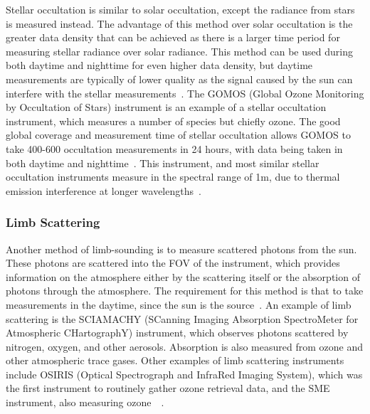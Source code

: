 Stellar occultation is similar to solar occultation, except the radiance from stars is measured instead. The advantage of this method over solar occultation is the greater data density that can be achieved as there is a larger time period for measuring stellar radiance over solar radiance. This method can be used during both daytime and nighttime for even higher data density, but daytime measurements are typically of lower quality as the signal caused by the sun can interfere with the stellar measurements~\citep{SPARC}. The GOMOS (Global Ozone Monitoring by Occultation of Stars) instrument is an example of a stellar occultation instrument, which measures a number of species but chiefly ozone. The good global coverage and measurement time of stellar occultation allows GOMOS to take 400-600 occultation measurements in 24 hours, with data being taken in both daytime and nighttime~\citep{GOMOS_stellar_occulation}. This instrument, and most similar stellar occultation instruments measure in the spectral range of 1\textmu m, due to thermal emission interference at longer wavelengths~\citep{SPARC}.

\subsubsection{Limb Scattering}
Another method of limb-sounding is to measure scattered photons from the sun. These photons are scattered into the FOV of the instrument, which provides information on the atmosphere either by the scattering itself or the absorption of photons through the atmosphere. The requirement for this method is that to take measurements in the daytime, since the sun is the source~\citep{SPARC}. An example of limb scattering is the SCIAMACHY (SCanning Imaging Absorption SpectroMeter for Atmospheric CHartographY) instrument, which observes photons scattered by nitrogen, oxygen, and other aerosols. Absorption is also measured from ozone and other atmospheric trace gases. Other examples of limb scattering instruments include OSIRIS (Optical Spectrograph and InfraRed Imaging System), which was the first instrument to routinely gather ozone retrieval data, and the SME instrument, also measuring ozone~\citep{OSIRIS}~\citep{SME}.

